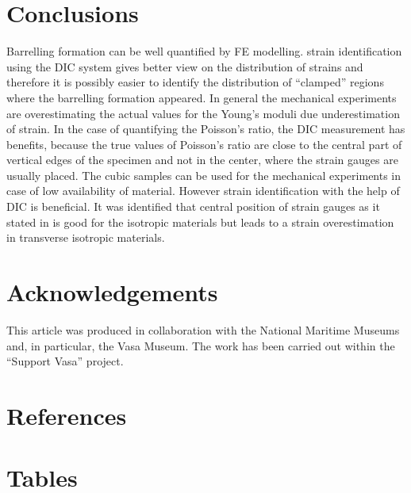 \documentclass[review]{elsarticle}
\begin{document}
\section{Conclusions}
Barrelling formation can be well quantified by  FE modelling. strain
identification using the DIC system gives better view on the distribution of
strains and therefore it is possibly easier to identify the distribution of
``clamped'' regions where the barrelling formation appeared. 
In general the mechanical experiments are overestimating the actual values for
the Young's moduli due underestimation of strain. In the case of quantifying the
Poisson's ratio, the DIC measurement has benefits, because the true values of Poisson's ratio are close
to the central part of vertical edges of the specimen and not in the center,
where the strain gauges are usually placed. 
The cubic samples can be used for the mechanical experiments in case of low
availability of material. However strain identification with the help of DIC is
beneficial. It was identified that central position of strain gauges as it
stated in is good for the isotropic materials but leads to a strain
overestimation in transverse isotropic materials. 


\section*{Acknowledgements}
This article was produced in collaboration with the National Maritime Museums
and, in particular, the Vasa Museum. The work has been carried
out within the ``Support Vasa'' project.
\section*{References}



\pagebreak
\section*{Tables}
\end{document}
